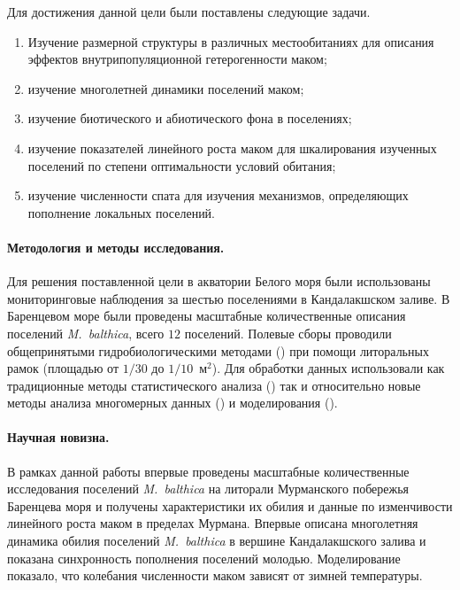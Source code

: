 Для достижения данной цели были поставлены следующие задачи.
  \begin{enumerate}
    \item Изучение размерной %
структуры в различных местообитаниях для описания эффектов внутрипопуляционной гетерогенности маком;
    \item изучение многолетней динамики поселений маком;
    \item изучение биотического и абиотического фона в поселениях;
    \item изучение показателей линейного роста маком для шкалирования изученных поселений по степени оптимальности условий обитания;
    \item изучение численности спата для изучения механизмов, определяющих пополнение локальных поселений.
  \end{enumerate}

\paragraph{Методология и методы исследования.}
Для решения поставленной цели в акватории Белого моря были использованы мониторинговые наблюдения за шестью поселениями в Кандалакшском заливе.
В Баренцевом море были проведены масштабные количественные описания поселений {\it M.~balthica}, всего $12$ поселений.
Полевые сборы проводили общепринятыми гидробиологическими методами (\cite{Eleftheriou_2013}) при помощи литоральных рамок (площадью от $1/30$ до $1/10$~м$^2$).
Для обработки данных использовали как традиционные методы статистического анализа (\cite{Tukey_1977, Mardia_et_al_1979, Chambers_Hastie_1991, Legendre_Legendre_2012, Hollander_et_al_2013}) так и относительно новые методы анализа многомерных данных (\cite{Clarke_et_al_2008}) и моделирования (\cite{Berryman_Turchin_2001}).

\paragraph{Научная новизна.}
В рамках данной работы впервые проведены масштабные количественные исследования поселений \textit{M.~balthica} на литорали Мурманского побережья Баренцева моря и получены характеристики их обилия и данные по изменчивости линейного роста маком в пределах Мурмана.
Впервые описана многолетняя динамика обилия поселений \textit{M.~balthica} в вершине Кандалакшского залива и показана синхронность пополнения поселений молодью.
Моделирование показало, что колебания численности маком зависят от зимней температуры.

